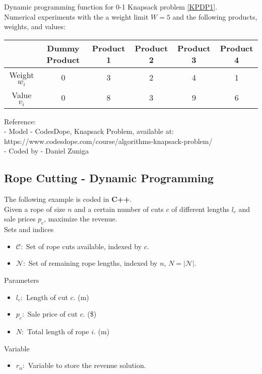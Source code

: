 \documentclass[10pt,bezier]{article}
\begin{document}
Dynamic programming function for 0-1 Knapsack problem \eqref{KPDP1}.\\

Numerical experiments with the a weight limit $W=5$ and the following products, weights, and values:
\begin{table}[!htbp]
    \centering
    \begin{tabular}{c | c c c c c}
            & Dummy Product & Product 1 & Product 2 & Product 3 & Product 4 \\ \hline
        Weight $w_i$ & 0 & 3 & 2 & 4 & 1\\
        Value $v_i$ & 0 & 8 & 3 & 9 & 6
    \end{tabular}
\end{table}

\noindent Reference:\\
- Model - CodesDope, Knapsack Problem, available at: {\color{blue}https://www.codesdope.com/course/algorithms-knapsack-problem/}\\
- Coded by - Daniel Zuniga

\newpage
\subsection{Rope Cutting - Dynamic Programming}\label{Section7.3}
The following example is coded in {\color{blue}\textbf{C++}}.\\

Given a rope of size $n$ and a certain number of cuts $c$ of different lengths $l_c$ and sale prices $p_c$, maximize the revenue.\\

\noindent Sets and indices
\begin{itemize}
  \item $\mathcal{C}$:~Set of rope cuts available, indexed by $c$.
  \item $\mathcal{N}$:~Set of remaining rope lengths, indexed by $n$, $N = |\mathcal{N}|$.
\end{itemize}
Parameters
\begin{itemize}
    \item $l_c$:~Length of cut $c$. (m)
    \item $p_c$:~Sale price of cut $c$. (\$)
    \item $N$:~Total length of rope $i$. (m)
\end{itemize}
Variable
\begin{itemize}
    \item $r_n$:~Variable to store the revenue solution.\\
\end{itemize}
\end{document}
